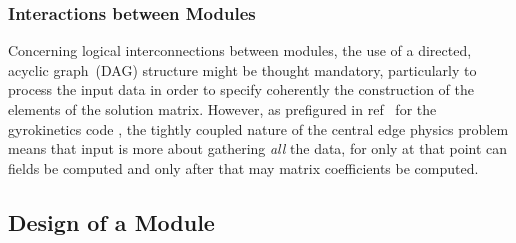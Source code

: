 \subsubsection{Interactions between Modules}\label{sec:modulint}
Concerning logical interconnections between modules, the 
use of  a directed, acyclic graph~(DAG) structure might be thought mandatory,
particularly to  process the input
data in order to specify coherently the construction of the elements of the solution matrix.
However, as prefigured in ref~\cite{y2re333} for the gyrokinetics code , the tightly coupled nature of the central edge
physics problem  means that input is more about gathering \emph{all} the data, for only at that point
can fields be computed and only after that may matrix coefficients be computed.

\subsection{Design of a Module}\label{sec:lowlevel}

